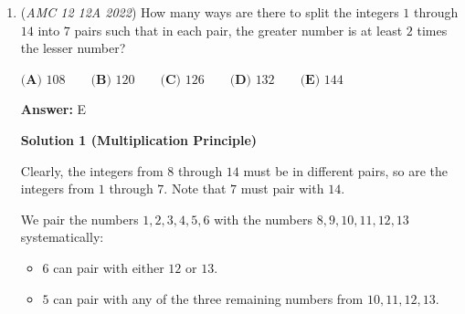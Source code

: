 \begin{enumerate}
 \textbf{Remark (Fake Solve)} This problem is broken in an interesting way that helps the test-taker. Since the true answers alternate for alternaters, you can still get the correct answer if you misinterpret the problem as "alternaters alternate their yes/no answers, but not their truth values". Suppose that $A$ alternaters answer yes-no-yes, and $A'$ alternaters answer no-yes-no. You still get $A=A'=9$. 

 In addition, you can even get the correct answer with the misinterpretation "alternaters have two types: alternaters of the same type give the same arbitrary answers to the three questions, and alternaters of different types give the opposite arbitrary answers to the three questions".

 It's also notable that the misinterpretation makes the problem harder, so that the solution actually relies on all the information. This suggests that the question-writer may have been mistaken but got lucky.

 


	\item (\textit{AMC 12 12A 2022}) How many ways are there to split the integers $1$ through $14$ into $7$ pairs such that in each pair, the greater number is at least $2$ times the lesser number?


 $\textbf{(A) } 108 \qquad \textbf{(B) } 120 \qquad \textbf{(C) } 126 \qquad \textbf{(D) } 132 \qquad \textbf{(E) } 144$

 \textbf{Answer: }E



\textbf{Solution 1 (Multiplication Principle)}

Clearly, the integers from $8$ through $14$ must be in different pairs, so are the integers from $1$ through $7.$ Note that $7$ must pair with $14.$

 We pair the numbers $1,2,3,4,5,6$ with the numbers $8,9,10,11,12,13$ systematically:

 
            \begin{itemize}
        \item $6$ can pair with either $12$ or $13.$
            \end{itemize}
            
            \begin{itemize}
        \item $5$ can pair with any of the three remaining numbers from $10,11,12,13.$
            \end{itemize}
            

\end{enumerate}
